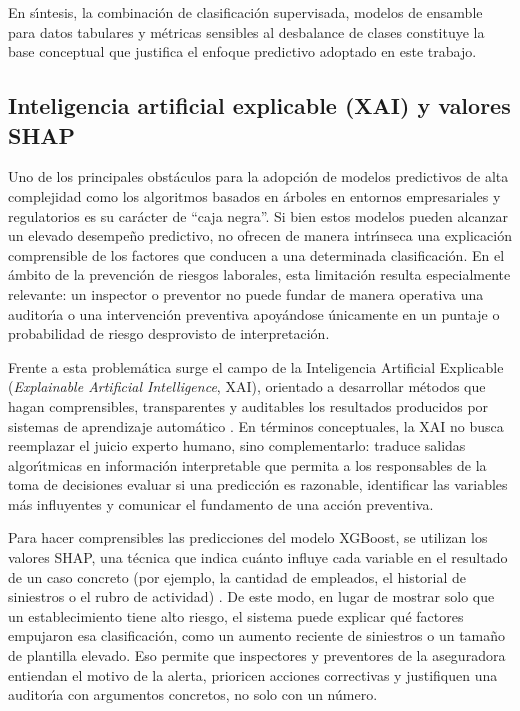 En s\'{\i}ntesis, la combinaci\'on de clasificaci\'on supervisada, modelos de ensamble para datos tabulares y m\'etricas sensibles al desbalance de clases constituye la base conceptual que justifica el enfoque predictivo adoptado en este trabajo.

\subsection{Inteligencia artificial explicable (XAI) y valores SHAP}

Uno de los principales obst\'aculos para la adopci\'on de modelos predictivos de alta complejidad como los algoritmos basados en \'arboles en entornos empresariales y regulatorios es su car\'acter de ``caja negra''. Si bien estos modelos pueden alcanzar un elevado desempe\~no predictivo, no ofrecen de manera intr\'{\i}nseca una explicaci\'on comprensible de los factores que conducen a una determinada clasificaci\'on. En el \'ambito de la prevenci\'on de riesgos laborales, esta limitaci\'on resulta especialmente relevante: un inspector o preventor no puede fundar de manera operativa una auditor\'{\i}a o una intervenci\'on preventiva apoy\'andose \'unicamente en un puntaje o probabilidad de riesgo desprovisto de interpretaci\'on.

Frente a esta problem\'atica surge el campo de la Inteligencia Artificial Explicable (\emph{Explainable Artificial Intelligence}, XAI), orientado a desarrollar m\'etodos que hagan comprensibles, transparentes y auditables los resultados producidos por sistemas de aprendizaje autom\'atico \parencite{arrieta2020}. En t\'erminos conceptuales, la XAI no busca reemplazar el juicio experto humano, sino complementarlo: traduce salidas algor\'{\i}tmicas en informaci\'on interpretable que permita a los responsables de la toma de decisiones evaluar si una predicci\'on es razonable, identificar las variables m\'as influyentes y comunicar el fundamento de una acci\'on preventiva.

Para hacer comprensibles las predicciones del modelo XGBoost, se utilizan los valores SHAP, una t\'ecnica que indica cu\'anto influye cada variable en el resultado de un caso concreto (por ejemplo, la cantidad de empleados, el historial de siniestros o el rubro de actividad) \parencite{lundberg2017}. De este modo, en lugar de mostrar solo que un establecimiento tiene alto riesgo, el sistema puede explicar qu\'e factores empujaron esa clasificaci\'on, como un aumento reciente de siniestros o un tama\~no de plantilla elevado. Eso permite que inspectores y preventores de la aseguradora entiendan el motivo de la alerta, prioricen acciones correctivas y justifiquen una auditor\'{\i}a con argumentos concretos, no solo con un n\'umero.

